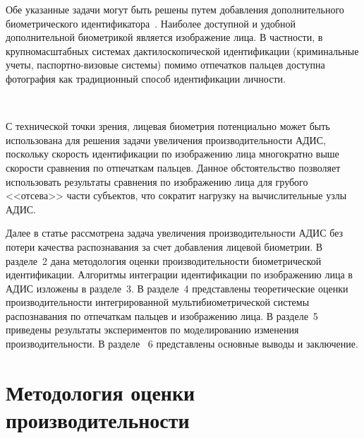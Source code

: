 \begin{multicols}{2}
     Обе указанные задачи могут быть решены путем добавления
дополнительного биометрического идентификатора~\cite{5ush}. Наиболее доступной и
удобной дополнительной биометрикой является изображение лица. В частности, в
крупномасштабных системах дактилоскопической идентификации (криминальные
учеты, паспортно-визовые системы) помимо отпечатков пальцев доступна фотография
как традиционный способ идентификации личности.

\begin{figure*} %
\vspace*{1pt}
\begin{center}
\mbox{%
\epsfxsize=104.24mm
}
\end{center}
\vspace*{-9pt}
\end{figure*}

     С технической точки зрения, лицевая био\-мет\-рия потенциально может быть
использована для решения задачи увеличения производительности АДИС, поскольку
скорость идентификации по изоб\-ра\-же\-нию лица многократно выше скорости сравнения
по отпечаткам пальцев. Данное обстоятельство позволяет использовать результаты
сравнения по изображению лица для грубого <<отсева>> части субъектов, что сократит
нагрузку на вы\-чис\-ли\-тель\-ные узлы АДИС.

     Далее в статье рассмотрена задача увеличения производительности АДИС без
потери качества распознавания за счет добавления лицевой биометрии. В разделе~2
дана методология оценки производительности биометрической идентификации.
Алгоритмы интеграции идентификации по изображению лица в АДИС изложены в
разделе~3. В разделе~4 представлены теоретические оценки производительности
интегрированной мультибиометрической системы распознавания по отпечаткам
пальцев и изображению лица. В разделе~5
приведены результаты экспериментов по
моделированию изменения производительности. В разделе~ 6 представлены основные
выводы и заклю\-чение.
{

}

\section{Методология оценки производительности}


\end{multicols}
